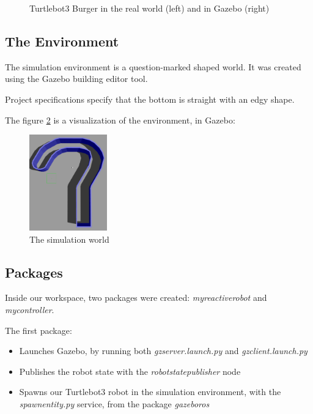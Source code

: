 \documentclass[conference]{IEEEtran}
\begin{document}
\begin{figure}[h]
\begin{minipage}{.4\columnwidth}
    \end{minipage}
    \caption{Turtlebot3 Burger in the real world (left) and in Gazebo (right)}
    \label{fig:robot-comparision}
\end{figure}

\subsection{The Environment}

The simulation environment is a question-marked shaped world. It was created using the Gazebo building
editor tool.

Project specifications specify that the bottom is straight with an edgy shape.

The figure \ref{fig:environment} is a visualization of the environment, in Gazebo:

\begin{figure}[h]
    \centering
    \includegraphics[width=0.3\textwidth]{images/world.png}
    \caption{The simulation world}
    \label{fig:environment}
\end{figure}

\subsection{Packages}

Inside our workspace, two packages were created: \emph{my\textunderscore reactive\textunderscore robot} and \emph{my\textunderscore controller}.

The first package:
\begin{itemize}
    \item Launches Gazebo, by running both \emph{gzserver.launch.py} and \emph{gzclient.launch.py}
    \item Publishes the robot state with the \emph{robot\textunderscore state\textunderscore publisher} node
    \item Spawns our Turtlebot3 robot in the simulation environment, with the \emph{spawn\textunderscore entity.py} service,
          from the package \emph{gazebo\textunderscore ros}
\end{itemize}
\end{document}
